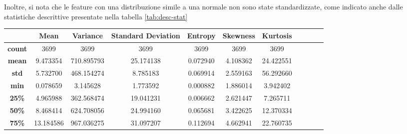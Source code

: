 Inoltre, si nota che le feature con una distribuzione simile a una normale non
sono state standardizzate, come indicato anche dalle statistiche descrittive
presentate nella tabella \ref{tab:desc-stat}
\begin{table}[!ht]
      \begin{subtable}[h]{1\textwidth}
            \centering
            \begin{tabular}{c|c c c c c c c c c c}
                  \hline
                  \rowcolor[HTML]{EFEFEF} \cellcolor[HTML]{EFEFEF}\textbf{} & \textbf{Mean} & \textbf{Variance} & \textbf{Standard Deviation} & \cellcolor[HTML]{EFEFEF}\textbf{Entropy} & \textbf{Skewness} & \textbf{Kurtosis} \\ \hline
                  \textbf{count}                                            & 3699          & 3699              & 3699                        & 3699                                     & 3699              & 3699              \\
                  \textbf{mean}                                             & 9.473354      & 710.895793        & 25.174138                   & 0.072940                                 & 4.108362          & 24.422551         \\
                  \textbf{std}                                              & 5.732700      & 468.154274        & 8.785183                    & 0.069914                                 & 2.559163          & 56.292660         \\
                  \textbf{min}                                              & 0.078659      & 3.145628          & 1.773592                    & 0.000882                                 & 1.886014          & 3.942402          \\
                  \textbf{25\%}                                             & 4.965988      & 362.568474        & 19.041231                   & 0.006662                                 & 2.621447          & 7.265711          \\
                  \textbf{50\%}                                             & 8.468414      & 624.708056        & 24.994160                   & 0.065681                                 & 3.422625          & 12.370334         \\
                  \textbf{75\%}                                             & 13.184586     & 967.036275        & 31.097207                   & 0.112694                                 & 4.662941          & 22.760735         \\

\end{tabular}
\end{subtable}
\end{table}
